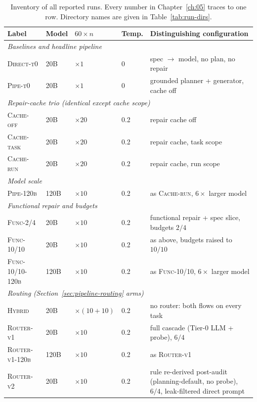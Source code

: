 \begin{table}[htbp]
  \centering
  \caption[Inventory of experimental runs]{Inventory of all reported runs.
    Every number in Chapter~\ref{ch:05} traces to one row. Directory names
    are given in Table~\ref{tab:run-dirs}.}
  \label{tab:run-inventory}
  \small
  \setlength{\tabcolsep}{4pt}
  \begin{tabular}{llllp{}}
    \toprule
    Label & Model & $60\times n$ & Temp. & Distinguishing configuration \\
    \midrule
    \multicolumn{5}{l}{\emph{Baselines and headline pipeline}} \\
    \textsc{Direct-t0}   & 20B  & $\times 1$  & 0   & spec $\to$ model, no plan, no repair \\
    \textsc{Pipe-t0}     & 20B  & $\times 1$  & 0   & grounded planner + generator, cache off \\
    \midrule
    \multicolumn{5}{l}{\emph{Repair-cache trio (identical except cache scope)}} \\
    \textsc{Cache-off}   & 20B  & $\times 20$ & 0.2 & repair cache off \\
    \textsc{Cache-task}  & 20B  & $\times 20$ & 0.2 & repair cache, task scope \\
    \textsc{Cache-run}   & 20B  & $\times 20$ & 0.2 & repair cache, run scope \\
    \midrule
    \multicolumn{5}{l}{\emph{Model scale}} \\
    \textsc{Pipe-120b}   & 120B & $\times 10$ & 0.2 & as \textsc{Cache-run}, $6\times$ larger model \\
    \midrule
    \multicolumn{5}{l}{\emph{Functional repair and budgets}} \\
    \textsc{Func-2/4}    & 20B  & $\times 10$ & 0.2 & functional repair + spec slice, budgets $2/4$ \\
    \textsc{Func-10/10}  & 20B  & $\times 10$ & 0.2 & as above, budgets raised to $10/10$ \\
    \textsc{Func-10/10-120b} & 120B & $\times 10$ & 0.2 & as \textsc{Func-10/10}, $6\times$ larger model \\
    \midrule
    \multicolumn{5}{l}{\emph{Routing (Section~\ref{sec:pipeline-routing} arms)}} \\
    \textsc{Hybrid}      & 20B  & $\times(10{+}10)$ & 0.2 & no router: both flows on every task \\
    \textsc{Router-v1}   & 20B  & $\times 10$ & 0.2 & full cascade (Tier-0 LLM + probe), $6/4$ \\
    \textsc{Router-v1-120b} & 120B & $\times 10$ & 0.2 & as \textsc{Router-v1} \\
    \textsc{Router-v2}   & 20B  & $\times 10$ & 0.2 & rule re-derived post-audit (planning-default, no probe), $6/4$, leak-filtered direct prompt \\
    \bottomrule
  \end{tabular}
\end{table}

